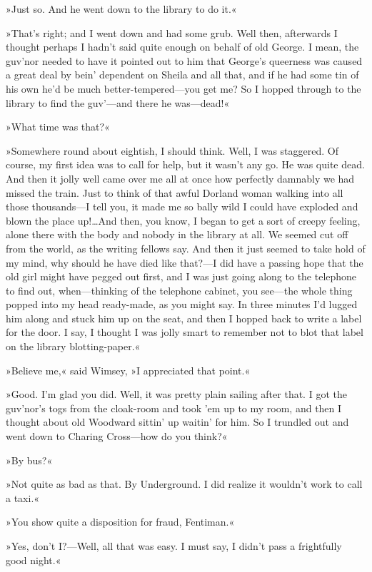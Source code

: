 »Just so. And he went down to the library to do it.«

»That's right; and I went down and had some grub. Well then, afterwards I thought perhaps I hadn't said quite enough on behalf of old George. I mean, the guv'nor needed to have it pointed out to him that George's queerness was caused a great deal by bein' dependent on Sheila and all that, and if he had some tin of his own he'd be much better-tempered—you get me? So I hopped through to the library to find the guv'—and there he was—dead!«

»What time was that?«

»Somewhere round about eightish, I should think. Well, I was staggered. Of course, my first idea was to call for help, but it wasn't any go. He was quite dead. And then it jolly well came over me all at once how perfectly damnably we had missed the train. Just to think of that awful Dorland woman walking into all those thousands—I tell you, it made me so bally wild I could have exploded and blown the place up!\dots And then, you know, I began to get a sort of creepy feeling, alone there with the body and nobody in the library at all. We seemed cut off from the world, as the writing fellows say. And then it just seemed to take hold of my mind, why should he have died like that?—I did have a passing hope that the old girl might have pegged out first, and I was just going along to the telephone to find out, when—thinking of the telephone cabinet, you see—the whole thing popped into my head ready-made, as you might say. In three minutes I'd lugged him along and stuck him up on the seat, and then I hopped back to write a label for the door. I say, I thought I was jolly smart to remember not to blot that label on the library blotting-paper.«

»Believe me,« said Wimsey, »I appreciated that point.«

»Good. I'm glad you did. Well, it was pretty plain sailing after that. I got the guv'nor's togs from the cloak-room and took 'em up to my room, and then I thought about old Woodward sittin' up waitin' for him. So I trundled out and went down to Charing Cross—how do you think?«

»By bus?«

»Not quite as bad as that. By Underground. I did realize it wouldn't work to call a taxi.«

»You show quite a disposition for fraud, Fentiman.«

»Yes, don't I?—Well, all that was easy. I must say, I didn't pass a frightfully good night.«

